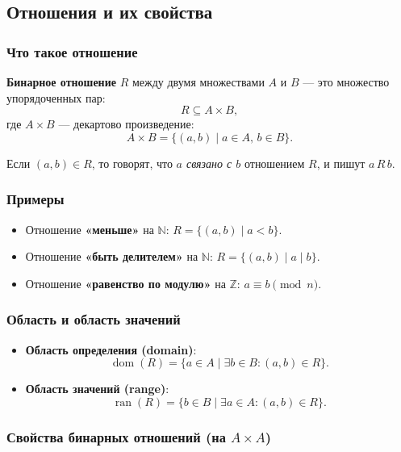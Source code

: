 \subsection{Отношения и их свойства}

\subsubsection{Что такое отношение}

\textbf{Бинарное отношение} $R$ между двумя множествами $A$ и $B$ — это множество упорядоченных пар:
\[
R \subseteq A \times B,
\]
где $A \times B$ — декартово произведение:
\[
A \times B = \{ (a, b) \mid a \in A,\, b \in B \}.
\]

Если $(a, b) \in R$, то говорят, что \textit{$a$ связано с $b$} отношением $R$, и пишут $a\,R\,b$.

\subsubsection{Примеры}

\begin{itemize}[leftmargin=*]
  \item Отношение \textbf{«меньше»} на $\mathbb{N}$: $R = \{(a, b) \mid a < b\}$.
  \item Отношение \textbf{«быть делителем»} на $\mathbb{N}$: $R = \{(a, b) \mid a \mid b\}$.
  \item Отношение \textbf{«равенство по модулю»} на $\mathbb{Z}$: $a \equiv b \pmod{n}$.
\end{itemize}

\subsubsection{Область и область значений}

\begin{itemize}[leftmargin=*]
  \item \textbf{Область определения (domain)}:
  \[
  \operatorname{dom}(R) = \{ a \in A \mid \exists b \in B\colon (a,b) \in R \}.
  \]
  \item \textbf{Область значений (range)}:
  \[
  \operatorname{ran}(R) = \{ b \in B \mid \exists a \in A\colon (a,b) \in R \}.
  \]
\end{itemize}

\subsubsection{Свойства бинарных отношений (на $A \times A$)}

